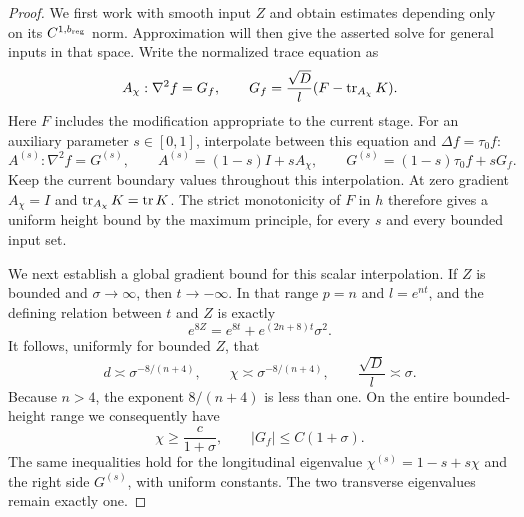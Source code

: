 \begin{proof}
We first work with smooth input $Z$ and obtain estimates depending
only on its $C^{1,b_{\rm reg}}$ norm.  Approximation will then give
the asserted solve for general inputs in that space.
Write the normalized trace equation as
\begin{equation}\label{e:normalized-trace}
 A_\chi:\nabla^2f=G_f,
 \qquad
 G_f=\frac{\sqrt D}{l}
           (F-\operatorname{tr}_{A_\chi}K).
\end{equation}
Here $F$ includes the modification appropriate to the current stage.
For an auxiliary parameter $s\in[0,1]$, interpolate between this
equation and $\Delta f=\tau_0f$:
\begin{equation}\label{e:scalar-interpolation}
 A^{(s)}:\nabla^2f=G^{(s)},\qquad
 A^{(s)}=(1-s)I+sA_\chi,\qquad
 G^{(s)}=(1-s)\tau_0f+sG_f.
\end{equation}
Keep the current boundary values throughout this interpolation.
At zero gradient $A_\chi=I$ and $\operatorname{tr}_{A_\chi}K=\operatorname{tr} K$.
The strict monotonicity of $F$ in $h$ therefore gives a uniform height
bound by the maximum principle, for every $s$ and every bounded input
set.

We next establish a global gradient bound for this scalar
interpolation.  If $Z$ is bounded and $\sigma\to\infty$, then
$t\to-\infty$.  In that range $p=n$ and $l=e^{nt}$, and the defining
relation between $t$ and $Z$ is exactly
\begin{equation}\label{e:nofloor-identity}
 e^{8Z}=e^{8t}+e^{(2n+8)t}\sigma^2.
\end{equation}
It follows, uniformly for bounded $Z$, that
\[
 d\asymp\sigma^{-8/(n+4)},\qquad
 \chi\asymp\sigma^{-8/(n+4)},\qquad
 \frac{\sqrt D}{l}\asymp\sigma.
\]
Because $n>4$, the exponent $8/(n+4)$ is less than one.  On the entire
bounded-height range we consequently have
\begin{equation}\label{e:nofloor-structure}
 \chi\ge\frac{c}{1+\sigma},\qquad
 |G_f|\le C(1+\sigma).
\end{equation}
The same inequalities hold for the longitudinal eigenvalue
$\chi^{(s)}=1-s+s\chi$ and the right side $G^{(s)}$, with uniform
constants.  The two transverse eigenvalues remain exactly one.


\end{proof}
